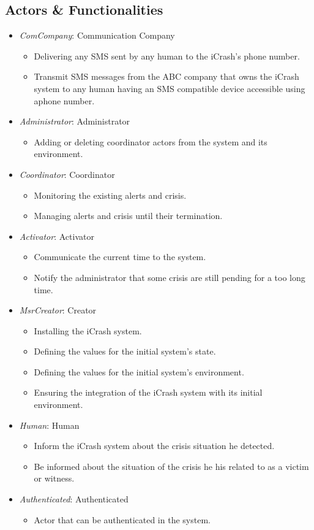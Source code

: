 \subsection{Actors \& Functionalities}
\begin{itemize}
\item \emph{ComCompany}: Communication Company 
	\begin{itemize}
	  \item Delivering any SMS sent by any human to the iCrash’s phone number.
	  \item Transmit SMS messages from the ABC company that owns the iCrash system
	  to any human having an SMS compatible device accessible using aphone number.
	\end{itemize}
\item \emph{Administrator}: Administrator
	\begin{itemize}
	  \item  Adding or deleting coordinator actors from the system and its
	  environment.
	\end{itemize}
\item \emph{Coordinator}: Coordinator
	\begin{itemize}
	  \item Monitoring the existing alerts and crisis.
	  \item Managing alerts and crisis until their termination.
	\end{itemize}
\item \emph{Activator}: Activator
	\begin{itemize}
	  \item Communicate the current time to the system.
	  \item Notify the administrator that some crisis are still pending for a too
	  long time.
	\end{itemize}
\item \emph{MsrCreator}: Creator
	\begin{itemize}
	  \item Installing the iCrash system.
	  \item Defining the values for the initial system’s state.
	  \item Defining the values for the initial system’s environment.
	  \item Ensuring the integration of the iCrash system with its initial
	  environment.
	\end{itemize}
\item \emph{Human}: Human
\begin{itemize}
  \item Inform the iCrash system about the crisis situation he detected.
  \item Be informed about the situation of the crisis he his related to as a
  victim or witness.
\end{itemize}
\item \emph{Authenticated}: Authenticated
\begin{itemize}
  \item Actor that can be authenticated in the system.
\end{itemize}
\end{itemize}



